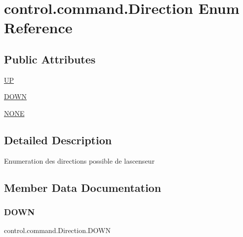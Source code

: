 \hypertarget{enumcontrol_1_1command_1_1_direction}{}\section{control.\+command.\+Direction Enum Reference}
\label{enumcontrol_1_1command_1_1_direction}
\subsection*{Public Attributes}
\begin{DoxyCompactItemize}
\item 
\mbox{\hyperlink{enumcontrol_1_1command_1_1_direction_adb50bdf4a75fea7f0cb851c1e5a42dd9}{UP}}
\item 
\mbox{\hyperlink{enumcontrol_1_1command_1_1_direction_a5e10e27a27903d7ae0e9f4273fcf334c}{D\+O\+WN}}
\item 
\mbox{\hyperlink{enumcontrol_1_1command_1_1_direction_a5af5c3d4fd087759beb683532646975b}{N\+O\+NE}}
\end{DoxyCompactItemize}


\subsection{Detailed Description}
Enumeration des directions possible de l\textquotesingle{}ascenseur 

\subsection{Member Data Documentation}
\mbox{\label{enumcontrol_1_1command_1_1_direction_a5e10e27a27903d7ae0e9f4273fcf334c}} 
\subsubsection{\texorpdfstring{DOWN}{DOWN}}
{\footnotesize\ttfamily control.\+command.\+Direction.\+D\+O\+WN}

\mbox{\label{enumcontrol_1_1command_1_1_direction_a5af5c3d4fd087759beb683532646975b}} 

